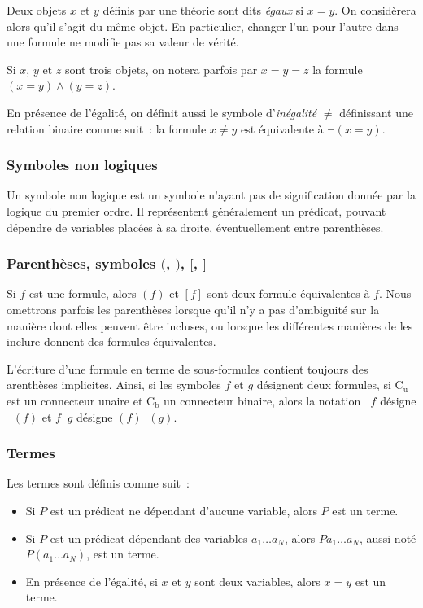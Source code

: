 Deux objets $x$ et $y$ définis par une théorie sont dits \textit{égaux} si $x = y$. 
On considèrera alors qu'il s'agit du même objet. 
En particulier, changer l'un pour l'autre dans une formule ne modifie pas sa valeur de vérité.

Si $x$, $y$ et $z$ sont trois objets, on notera parfois par $x = y = z$ la formule $(x = y) \wedge (y = z)$. 

En présence de l'égalité, on définit aussi le symbole d'\textit{inégalité} $\neq$ définissant une relation binaire comme suit : la formule $x \neq y$ est équivalente à $\neg (x = y)$.

\subsubsection{Symboles non logiques}

Un symbole non logique est un symbole n'ayant pas de signification donnée par la logique du premier ordre. 
Il représentent généralement un prédicat, pouvant dépendre de variables placées à sa droite, éventuellement entre parenthèses.

\subsubsection{Parenthèses, symboles \texorpdfstring{$($, $)$, $[$, $]$}{(, ), [, ]}}

\sindex[isy]{$($}\sindex[isy]{$)$}\sindex[isy]{$[$}\sindex[isy]{$]$}
Si $f$ est une formule, alors $(f)$ et $[f]$ sont deux formule équivalentes à $f$. 
Nous omettrons parfois les parenthèses lorsque qu'il n'y a pas d'ambiguité sur la manière dont elles peuvent être incluses, ou lorsque les différentes manières de les inclure donnent des formules équivalentes. 

L'écriture d'une formule en terme de sous-formules contient toujours des arenthèses implicites. 
Ainsi, si les symboles $f$ et $g$ désignent deux formules, si $\mathrm{C_u}$ est un connecteur unaire et $\mathrm{C_b}$ un connecteur binaire, alors la notation $\mathop{\mathrm{C_u}} f$ désigne $\mathop{\mathrm{C_u}} (f)$ et $f \mathop{\mathrm{C_b}} g$ désigne $(f) \mathop{\mathrm{C_b}} (g)$.

\subsubsection{Termes}

Les termes sont définis comme suit : 
\begin{itemize}
    \item Si $P$ est un prédicat ne dépendant d'aucune variable, alors $P$ est un terme.
    \item Si $P$ est un prédicat dépendant des variables $a_1 \dots a_N$, alors $P a_1 \dots a_N$, aussi noté $P (a_1 \dots a_N)$, est un terme. 
    \item En présence de l'égalité, si $x$ et $y$ sont deux variables, alors $x = y$ est un terme.
\end{itemize}


